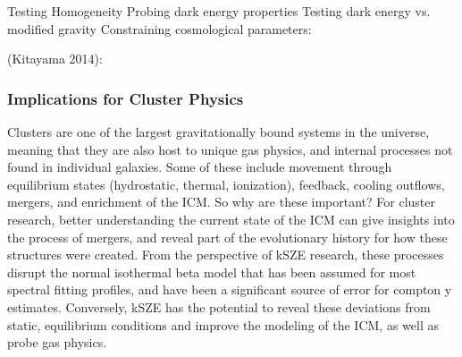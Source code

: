 \documentclass[manuscript]{aastex}
\begin{document}


Testing Homogeneity
Probing dark energy properties
Testing dark energy vs. modified gravity
 Constraining cosmological parameters:

(Kitayama 2014):
	
\subsubsection{Implications for Cluster Physics}

Clusters are one of the largest gravitationally bound systems in the universe, meaning that they are also host to unique gas physics, and internal processes not found in individual galaxies. Some of these include movement through equilibrium states (hydrostatic, thermal, ionization), feedback, cooling outflows, mergers, and enrichment of the ICM. So why are these important? For cluster research, better understanding the current state of the ICM can give insights into the process of mergers, and reveal part of the evolutionary history for how these structures were created. From the perspective of kSZE research, these processes disrupt the normal isothermal beta model that has been assumed for most spectral fitting profiles, and have been a significant source of error for compton y estimates. Conversely, kSZE has the potential to reveal these deviations from static, equilibrium conditions and improve the modeling of the ICM, as well as probe gas physics. 
\end{document}
